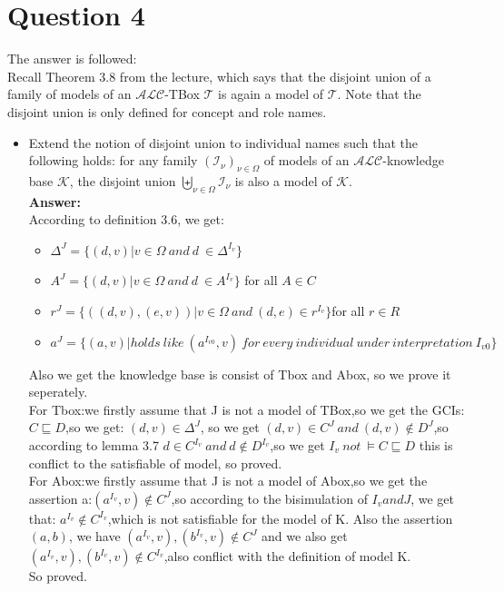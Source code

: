 \documentclass{article}
\begin{document}
    \section{Question 4}
    The answer is followed:\\
    Recall Theorem 3.8 from the lecture, which says that the disjoint union of a family of models of an $\mathcal{ALC}$-TBox $\mathcal{T}$ is again a model of $\mathcal{T}$. Note that the disjoint union is only defined for concept and role names.
    \begin{itemize}
        \item Extend the notion of disjoint union to individual names such that the following holds: for any family $(\mathcal{I}_{\nu})_{\nu\in\Omega}$ of models of an $\mathcal{ALC}$-knowledge base $\mathcal{K}$, the disjoint union $\biguplus_{\nu\in\Omega}\mathcal{I}_{\nu}$ is also a model of $\mathcal{K}$.\\
        
        \textbf{Answer:}\\
        According to definition 3.6, we get:
        \begin{itemize}
            \item $\Delta^J = \{(d,v)| v \in \Omega\ and\ d\ \in \Delta^{I_v}\}$
            \item $A^J = \{(d,v)| v \in \Omega\ and\ d\ \in A^{I_v}\}$ for all $A \in C$
            \item $r^J = \{((d,v),(e,v))| v \in \Omega\ and\ (d,e) \in r^{I_v}\}$for all $r \in R$      
            \item $a^J = \{(a,v)| holds\ like\ (a^{I_{v0}},v)\ for\ every\ individual\ under\ interpretation\ I_{v0}\}$
        \end{itemize}
        Also we get the knowledge base is consist of Tbox and Abox, so we prove it seperately.\\
        For Tbox:we firstly assume that J is not a model of TBox,so we get the GCIs:$C \sqsubseteq D $,so we get:
        $(d,v) \in \Delta^J$, so we get $(d,v)\in C^J\ and\ (d,v)\notin D^J$,so according to lemma 3.7 $d\in C^{I_v}\ and\ d\notin D^{I_v}$,so we get
        $I_v\ not\ \models  C \sqsubseteq D$ this is conflict to the satisfiable of model, so proved.\\
        For Abox:we firstly assume that J is not a model of Abox,so we get the assertion a:$(a^{I_v},v)\notin C^J$,so according to the bisimulation of $I_v and J$, we get that: $a^{I_v} \notin C^{I_v}$,which is not satisfiable for the model of K.
        Also the assertion $(a,b)$, we have $(a^{I_v},v),(b^{I_v},v) \notin C^J$ and we also get $(a^{I_v},v),(b^{I_v},v) \notin C^{I_v}$,also conflict with the definition of model K.\\
        So proved.\\
    \end{itemize}
\end{document}
